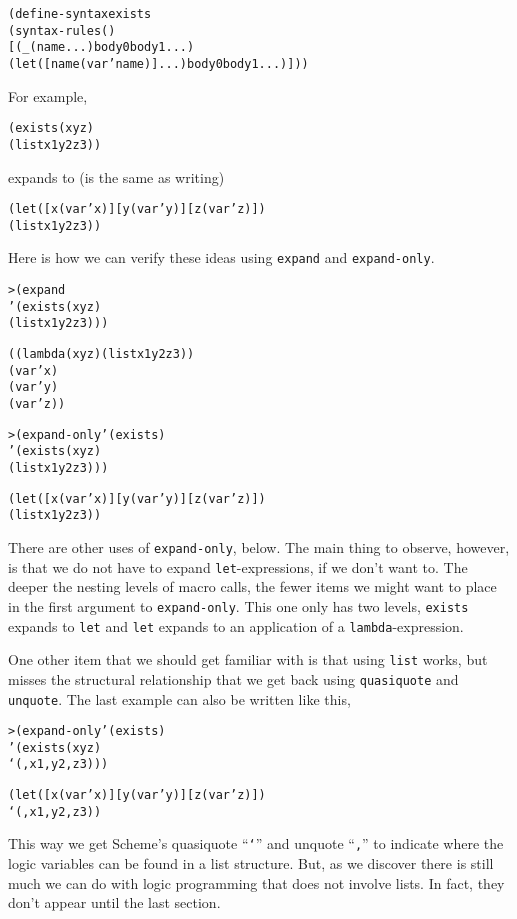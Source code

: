 \begin{alltt}
(define-syntax exists
  (syntax-rules ()
    [(_ (name ...) body0 body1 ...)
     (let ([name (var 'name)] ...) body0 body1 ...)]))
\end{alltt}

\noindent
For example,
\begin{alltt}
(exists (x y z)
  (list x 1 y 2 z 3))
  
\end{alltt}

\noindent
expands to (is the same as writing)

\begin{alltt}
(let ([x (var 'x)] [y (var 'y)] [z (var 'z)])
  (list x 1 y 2 z 3))
\end{alltt}

Here is how we can verify these ideas using \texttt{expand} and
\texttt{expand-only}.

\begin{alltt}
> (expand 
    '(exists (x y z)
       (list x 1 y 2 z 3)))

((lambda (x y z) (list x 1 y 2 z 3))
 (var 'x)
 (var 'y)
 (var 'z))

> (expand-only '(exists)
    '(exists (x y z)
       (list x 1 y 2 z 3)))

(let ([x (var 'x)] [y (var 'y)] [z (var 'z)])
  (list x 1 y 2 z 3))
\end{alltt}

There are other uses of \texttt{expand-only}, below.  The main thing
to observe, however, is that we do not have to expand
\texttt{let}-expressions, if we don't want to.  The deeper the nesting
levels of macro calls, the fewer items we might want to place in the
first argument to \texttt{expand-only}.  This one only has two levels,
\texttt{exists} expands to \texttt{let} and \texttt{let} expands to an
application of a \texttt{lambda}-expression.

One other item that we should get familiar with is that using \texttt{list}
works, but misses the structural relationship that we get back using
\texttt{quasiquote} and \texttt{unquote}.  The last example can also be
written like this,

\begin{alltt}
> (expand-only '(exists)
    '(exists (x y z)
       `(,x 1 ,y 2 ,z 3)))

(let ([x (var 'x)] [y (var 'y)] [z (var 'z)])
  `(,x 1 ,y 2 ,z 3))
\end{alltt}

This way we get Scheme's quasiquote ``\texttt{`}'' and unquote
``\texttt{,}'' to indicate where the logic variables can be found in a
list structure.  But, as we discover there is still much we can do
with logic programming that does not involve lists.  In fact, they
don't appear until the last section.

